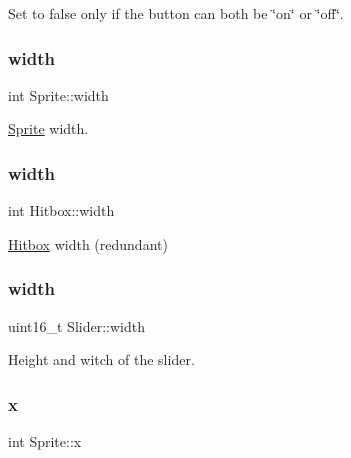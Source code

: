 Set to false only if the button can both be \char`\"{}on\char`\"{} or \char`\"{}off\char`\"{}. 

\mbox{\label{group__sprite_ga0a3364944c5e361fc9e7ae406224d682}} 
\subsubsection{\texorpdfstring{width}{width}\hspace{0.1cm}{\footnotesize\ttfamily [1/3]}}
{\footnotesize\ttfamily int Sprite\+::width}



\mbox{\hyperlink{struct_sprite}{Sprite}} width. 

\mbox{\label{group__sprite_ga1eddadd54a3cd0e831f55c322892e687}} 
\subsubsection{\texorpdfstring{width}{width}\hspace{0.1cm}{\footnotesize\ttfamily [2/3]}}
{\footnotesize\ttfamily int Hitbox\+::width}



\mbox{\hyperlink{struct_hitbox}{Hitbox}} width (redundant) 

\mbox{\label{group__sprite_ga4ccd5dd9d8b0c329101310f2dd24fbe5}} 
\subsubsection{\texorpdfstring{width}{width}\hspace{0.1cm}{\footnotesize\ttfamily [3/3]}}
{\footnotesize\ttfamily uint16\+\_\+t Slider\+::width}



Height and witch of the slider. 

\mbox{\label{group__sprite_gab36028dcefdd4bf024c52c8d9519a283}} 
\subsubsection{\texorpdfstring{x}{x}\hspace{0.1cm}{\footnotesize\ttfamily [1/4]}}
{\footnotesize\ttfamily int Sprite\+::x}



